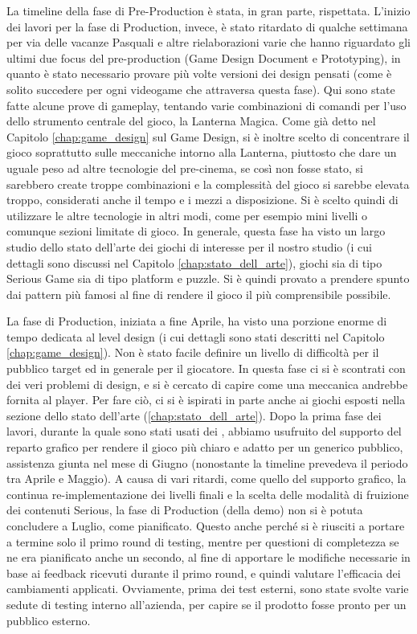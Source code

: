 \begin{itemize}
\end{itemize}

La timeline della fase di Pre-Production è stata, in gran parte, rispettata.
L'inizio dei lavori per la fase di Production, invece, è stato ritardato di qualche settimana per via delle vacanze Pasquali e altre rielaborazioni varie che hanno riguardato gli ultimi due focus del pre-production (Game Design Document e Prototyping), in quanto è stato necessario provare più volte versioni dei design pensati (come è solito succedere per ogni videogame che attraversa questa fase). Qui sono state fatte alcune prove di gameplay, tentando varie combinazioni di comandi per l'uso dello strumento centrale del gioco, la Lanterna Magica. Come già detto nel Capitolo \ref{chap:game_design} sul Game Design, si è inoltre scelto di concentrare il gioco soprattutto sulle meccaniche intorno alla Lanterna, piuttosto che dare un uguale peso ad altre tecnologie del pre-cinema, se così non fosse stato, si sarebbero create troppe combinazioni e la complessità del gioco si sarebbe elevata troppo, considerati anche il tempo e i mezzi a disposizione. Si è scelto quindi di utilizzare le altre tecnologie in altri modi, come per esempio mini livelli o comunque sezioni limitate di gioco. In generale, questa fase ha visto un largo studio dello stato dell'arte dei giochi di interesse per il nostro studio (i cui dettagli sono discussi nel Capitolo \ref{chap:stato_dell_arte}), giochi sia di tipo Serious Game sia di tipo platform e puzzle. Si è quindi provato a prendere spunto dai pattern più famosi al fine di rendere il gioco il più comprensibile possibile.

La fase di Production, iniziata a fine Aprile, ha visto una porzione enorme di tempo dedicata al level design (i cui dettagli sono stati descritti nel Capitolo \ref{chap:game_design}). Non è stato facile definire un livello di difficoltà per il pubblico target ed in generale per il giocatore. In questa fase ci si è scontrati con dei veri problemi di design, e si è cercato di capire come una meccanica andrebbe fornita al player. Per fare ciò, ci si è ispirati in parte anche ai giochi esposti nella sezione dello stato dell'arte (\ref{chap:stato_dell_arte}). Dopo la prima fase dei lavori, durante la quale sono stati usati dei , abbiamo usufruito del supporto del reparto grafico per rendere il gioco più chiaro e adatto per un generico pubblico, assistenza giunta nel mese di Giugno (nonostante la timeline prevedeva il periodo tra Aprile e Maggio). A causa di vari ritardi, come quello del supporto grafico, la continua re-implementazione dei livelli finali e la scelta delle modalità di fruizione dei contenuti Serious, la fase di Production (della demo) non si è potuta concludere a Luglio, come pianificato. Questo anche perché si è riusciti a portare a termine solo il primo round di testing, mentre per questioni di completezza se ne era pianificato anche un secondo, al fine di apportare le modifiche necessarie in base ai feedback ricevuti durante il primo round, e quindi valutare l'efficacia dei cambiamenti applicati. Ovviamente, prima dei test esterni, sono state svolte varie sedute di testing interno all'azienda, per capire se il prodotto fosse pronto per un pubblico esterno.


